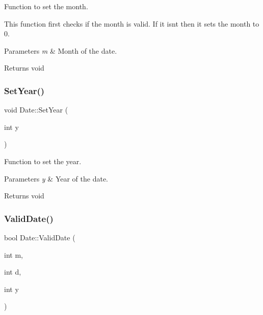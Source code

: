 Function to set the month. 

This function first checks if the month is valid. If it isn\textquotesingle{}t then it sets the month to 0.


\begin{DoxyParams}{Parameters}
{\em m} & Month of the date.\\
\hline
\end{DoxyParams}
\begin{DoxyReturn}{Returns}
void 
\end{DoxyReturn}
\mbox{\label{class_date_ae77d46d475c904d1fabcb91933034514}} 
\subsubsection{\texorpdfstring{SetYear()}{SetYear()}}
{\footnotesize\ttfamily void Date\+::\+Set\+Year (\begin{DoxyParamCaption}\item[{int}]{y }\end{DoxyParamCaption})\hspace{0.3cm}{\ttfamily [inline]}}



Function to set the year. 


\begin{DoxyParams}{Parameters}
{\em y} & Year of the date.\\
\hline
\end{DoxyParams}
\begin{DoxyReturn}{Returns}
void 
\end{DoxyReturn}
\mbox{\label{class_date_ac195c8a2d57b37dcbf3f0c555d403b5e}} 
\subsubsection{\texorpdfstring{ValidDate()}{ValidDate()}}
{\footnotesize\ttfamily bool Date\+::\+Valid\+Date (\begin{DoxyParamCaption}\item[{int}]{m,  }\item[{int}]{d,  }\item[{int}]{y }\end{DoxyParamCaption})\hspace{0.3cm}{\ttfamily [inline]}}



